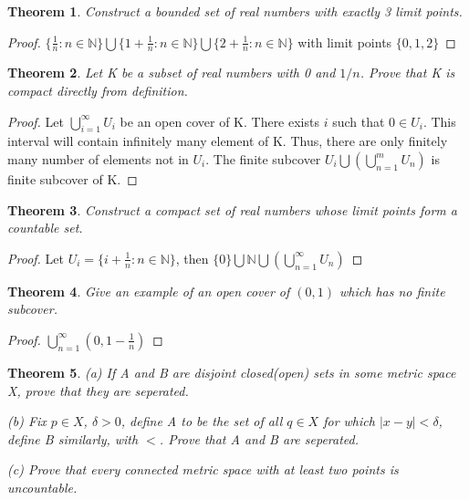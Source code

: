 \documentclass{article}
\theoremstyle{plain}
\newtheorem{theorem}{Theorem}
\theoremstyle{definition}
\begin{document}
\begin{theorem}
	Construct a bounded set of real numbers with exactly 3 limit points.
\end{theorem}

\begin{proof}
	$\{ \frac{1}{n}: n \in \mathbb{N} \} \bigcup \{1 + \frac{1}{n}: n \in \mathbb{N}\} \bigcup \{ 2 + \frac{1}{n}: n \in \mathbb{N} \}$ with limit points $\{0,1,2\}$
\end{proof}

\begin{theorem}
	Let K be a subset of real numbers with 0 and $1/n$. Prove that K is compact directly from definition.
\end{theorem}

\begin{proof}
	Let $\bigcup_{i = 1}^{\infty} U_{i}$ be an open cover of K. There exists $i$ such that $0 \in U_{i}$. This interval will contain infinitely many element of K. Thus, there are only finitely many number of elements not in $U_{i}$. The finite subcover $U_{i} \bigcup (\bigcup_{n = 1}^{m} U_{n})$ is finite subcover of K.
\end{proof}

\begin{theorem}
	Construct a compact set of real numbers whose limit points form a countable set.
\end{theorem}

\begin{proof}
	Let $U_{i} = \{ i + \frac{1}{n}: n \in \mathbb{N} \}$, then $\{0\} \bigcup \mathbb{N} \bigcup (\bigcup_{n = 1}^{\infty} U_{n})$
\end{proof}

\begin{theorem}
	Give an example of an open cover of $(0,1)$ which has no finite subcover.
\end{theorem}
\begin{proof}
	$\bigcup_{n = 1}^{\infty} (0, 1 - \frac{1}{n})$
\end{proof}

\begin{theorem}
	(a) If A and B are disjoint closed(open) sets in some metric space X, prove that they are seperated.

	(b) Fix $p \in X$, $\delta > 0$, define A to be the set of all $q \in X$ for which $| x - y | < \delta$, define B similarly, with $<$. Prove that A and B are seperated.

	(c) Prove that every connected metric space with at least two points is uncountable.

\end{theorem}
\end{document}
